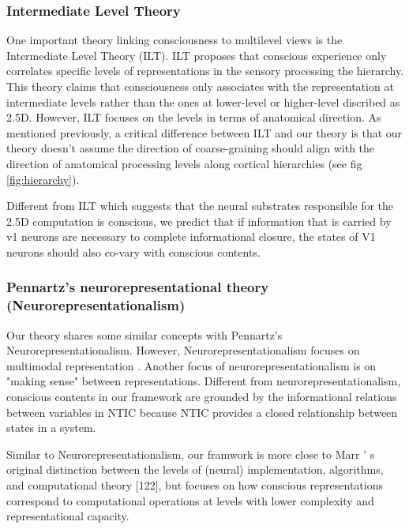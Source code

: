 \documentclass[utf8]{article}
\begin{document}
                
			

			\subsubsection{Intermediate Level Theory} \label{IntermediateLevelTheory}
                One important theory linking consciousness to multilevel views is the Intermediate Level Theory (ILT). ILT proposes that conscious experience only correlates specific levels of representations in the sensory processing the hierarchy. This theory claims that consciousness only associates with the representation at intermediate levels rather than the ones at lower-level or higher-level discribed as 2.5D. However, ILT focuses on the levels in terms of anatomical direction. As mentioned previously, a critical difference between ILT and our theory is that our theory doesn't assume the direction of coarse-graining should align with the direction of anatomical processing levels along cortical hierarchies (see fig \ref{fig:hierarchy}).
                
                Different from ILT which suggests that the neural substrates responsible for the 2.5D computation is conscious, we predict that if information that is carried by v1 neurons are necessary to complete informational closure, the states of V1 neurons should also co-vary with conscious contents. 
				
			\subsubsection{Pennartz's neurorepresentational theory (Neurorepresentationalism)}
			    Our theory shares some similar concepts with Pennartz's Neurorepresentationalism. However, Neurorepresentationalism focuses on multimodal representation \cite{pennartz2018consciousness,pennartz2015brain}. Another focus of neurorepresentationalism is on "making sense" between representations. Different from neurorepresentationalism, conscious contents in our framework are grounded by the informational relations between variables in NTIC because NTIC provides a closed relationship between states in a system. 
			    
			    Similar to Neurorepresentationalism, our framwork is more close to Marr ’ s original distinction between the levels of (neural) implementation, algorithms, and computational theory [122], but focuses on how conscious representations correspond to computational operations at levels with lower complexity and representational capacity.\cite{pennartz2018consciousness,pennartz2015brain}
			    
\end{document}
